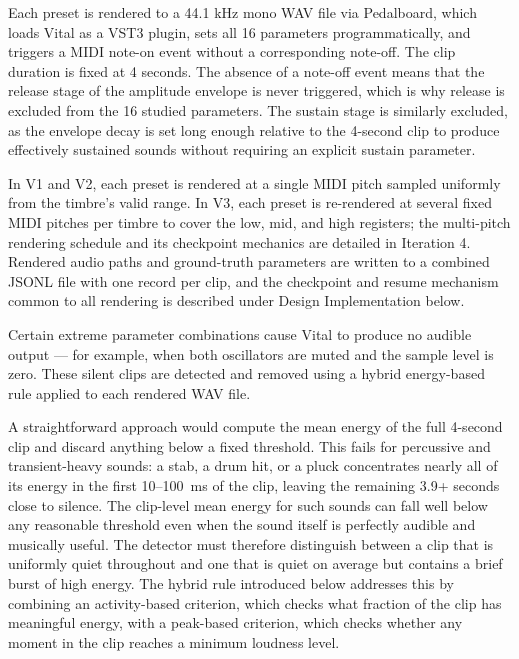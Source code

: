 \noindent{}

Each preset is rendered to a 44.1 kHz mono WAV file via Pedalboard, which loads Vital as a VST3 plugin, sets all 16 parameters programmatically, and triggers a MIDI note-on event without a corresponding note-off. The clip duration is fixed at 4 seconds. The absence of a note-off event means that the release stage of the amplitude envelope is never triggered, which is why release is excluded from the 16 studied parameters. The sustain stage is similarly excluded, as the envelope decay is set long enough relative to the 4-second clip to produce effectively sustained sounds without requiring an explicit sustain parameter.

\par \vspace{0.3cm}
In V1 and V2, each preset is rendered at a single MIDI pitch sampled uniformly from the timbre's valid range. In V3, each preset is re-rendered at several fixed MIDI pitches per timbre to cover the low, mid, and high registers; the multi-pitch rendering schedule and its checkpoint mechanics are detailed in Iteration 4. Rendered audio paths and ground-truth parameters are written to a combined JSONL file with one record per clip, and the checkpoint and resume mechanism common to all rendering is described under Design Implementation below.

\noindent{}

Certain extreme parameter combinations cause Vital to produce no audible output — for example, when both oscillators are muted and the sample level is zero. These silent clips are detected and removed using a hybrid energy-based rule applied to each rendered WAV file.

\par \vspace{0.3cm}
\noindent A straightforward approach would compute the mean energy of the full 4-second clip and discard anything below a fixed threshold. This fails for percussive and transient-heavy sounds: a stab, a drum hit, or a pluck concentrates nearly all of its energy in the first 10--100~ms of the clip, leaving the remaining 3.9+ seconds close to silence. The clip-level mean energy for such sounds can fall well below any reasonable threshold even when the sound itself is perfectly audible and musically useful. The detector must therefore distinguish between a clip that is uniformly quiet throughout and one that is quiet on average but contains a brief burst of high energy. The hybrid rule introduced below addresses this by combining an activity-based criterion, which checks what fraction of the clip has meaningful energy, with a peak-based criterion, which checks whether any moment in the clip reaches a minimum loudness level.

